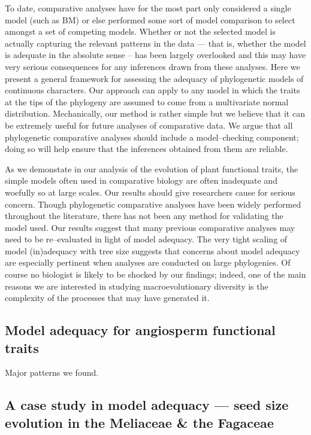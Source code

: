 \documentclass[a4paper,12pt]{article}
\begin{document}
To date, comparative analyses have for the most part only considered a single model (such as BM) or else performed some sort of model comparison to select amongst a set of competing models. Whether or not the selected model is actually capturing the relevant patterns in the data --- that is, whether the model is adequate in the absolute sense -- has been largely overlooked and this may have very serious consequences for any inferences drawn from these analyses. Here we present a general framework for assessing the adequacy of phylogenetic models of continuous characters. Our approach can apply to any model in which the traits at the tips of the phylogeny are assumed to come from a multivariate normal distribution. Mechanically, our method is rather simple but we believe that it can be extremely useful for future analyses of comparative data. We argue that all phylogenetic comparative analyses should include a model--checking component; doing so will help ensure that the inferences obtained from them are reliable.

As we demonstate in our analysis of the evolution of plant functional traits, the simple models often used in comparative biology are often inadequate and woefully so at large scales. Our results should give researchers cause for serious concern. Though phylogenetic comparative analyses have been widely performed throughout the literature, there has not been any method for validating the model used. Our results suggest that many previous comparative analyses may need to be re--evaluated in light of model adequacy. The very tight scaling of model (in)adequacy with tree size suggests that concerns about model adequacy are especially pertinent when analyses are conducted on large phylogenies. Of course no biologist is likely to be shocked by our findings; indeed, one of the main reasons we are interested in studying macroevolutionary diversity is the complexity of the processes that may have generated it.  

\subsection{Model adequacy for angiosperm functional traits}
Major patterns we found.

\subsection*{A case study in model adequacy --- seed size evolution in the Meliaceae \& the Fagaceae}
\end{document}
